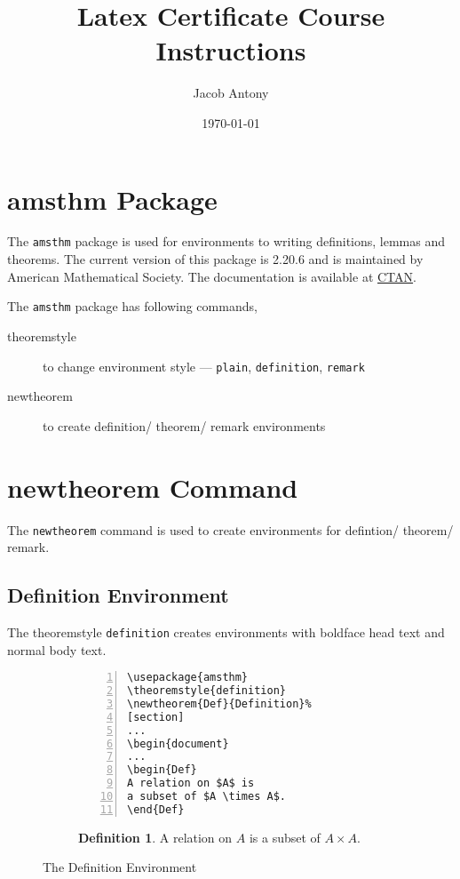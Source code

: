 \documentclass{article}
\title{Latex Certificate Course Instructions}
\author{Jacob Antony}
\date{\today}
\theoremstyle{definition}
\newtheorem{Def}{Definition}[section]
\theoremstyle{remark}
\begin{document}
\maketitle

\section{amsthm Package}
	The \texttt{amsthm} package is used for environments to writing definitions, lemmas and theorems. The current version of this package is 2.20.6 and is maintained by American Mathematical Society. The documentation is available at \href{https://ctan.org/pkg/amsthm}{CTAN}.

	The \texttt{amsthm} package has following commands,
\begin{description}
	\item[theoremstyle] to change environment style --- \texttt{plain}, \texttt{definition}, \texttt{remark}
	\item[newtheorem] to create definition/ theorem/ remark environments
\end{description}

\section{newtheorem Command}
	The \texttt{newtheorem} command is used to create environments for defintion/ theorem/ remark.

\subsection{Definition Environment}
	The theoremstyle \texttt{definition} creates environments with boldface head text and normal body text.
\begin{figure}[h]
\centering
\begin{subfigure}{0.45\textwidth}
\begin{Verbatim}[numbers = left]
\usepackage{amsthm}
\theoremstyle{definition}
\newtheorem{Def}{Definition}%
[section]
...
\begin{document}
...
\begin{Def}
A relation on $A$ is
a subset of $A \times A$.
\end{Def}
\end{Verbatim}
\end{subfigure}
\begin{subfigure}{0.45\textwidth}
\begin{Def}
A relation on $A$ is
a subset of $A \times A$.
\end{Def}
\end{subfigure} 
\caption{The Definition Environment}
\label{fig:defEnvironment}
\end{figure}
\end{document}
